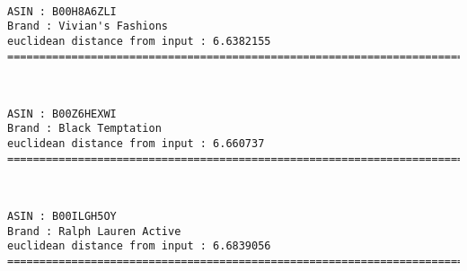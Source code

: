 \documentclass[11pt]{article}
\begin{document}
    \begin{center}
    \end{center}
    { \hspace*{\fill} \\}
    
    \begin{Verbatim}[commandchars=\\\{\}]
ASIN : B00H8A6ZLI
Brand : Vivian's Fashions
euclidean distance from input : 6.6382155
=============================================================================================================================

    \end{Verbatim}

    \begin{center}
    \end{center}
    { \hspace*{\fill} \\}
    
    \begin{Verbatim}[commandchars=\\\{\}]
ASIN : B00Z6HEXWI
Brand : Black Temptation
euclidean distance from input : 6.660737
=============================================================================================================================

    \end{Verbatim}

    \begin{center}
    \end{center}
    { \hspace*{\fill} \\}
    
    \begin{Verbatim}[commandchars=\\\{\}]
ASIN : B00ILGH5OY
Brand : Ralph Lauren Active
euclidean distance from input : 6.6839056
=============================================================================================================================

    \end{Verbatim}

    \begin{center}
    \end{center}
    { \hspace*{\fill} \\}
    
\end{document}
